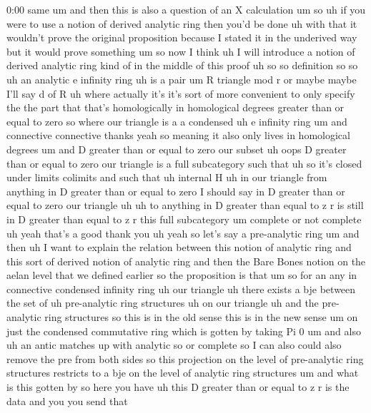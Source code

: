\begin{unfinished}{0:00}
same  um  and  then  this  is  also  a  question
of  an  X
calculation
um  so  uh  if  you  were  to  use  a  notion  of
derived  analytic  ring  then  you'd  be
done  uh  with  that  it  wouldn't  prove  the
original  proposition  because  I  stated  it
in  the  underived  way  but  it  would  prove
something  um  so  now  I  think  uh  I  will
introduce  a  notion  of  derived  analytic
ring  kind  of  in  the  middle  of  this
proof  uh
so  so
definition  so  so  uh  an
analytic  e  infinity  ring
uh  is  a
pair  um  R  triangle  mod  r  or  maybe  maybe
I'll  say  d  of
R  uh
where  actually  it's  it's  sort  of  more
convenient  to  only  specify  the  the  part
that  that's  homologically  in  homological
degrees  greater  than  or  equal  to  zero  so
where  our
triangle  is  a  a
condensed  uh  e  infinity
ring  um
and  connective  connective  thanks
yeah  so  meaning  it  also  only  lives  in
homological  degrees  um  and  D  greater
than  or  equal  to  zero  our  subset  uh  oops
D  greater  than  or  equal  to  zero  our
triangle  is  a  full  subcategory
such  that  uh  so  it's  closed
under  limits
colimits  and  such
that  uh  internal
H  uh  in  our  triangle  from  anything  in  D
greater  than  or  equal  to  zero  I  should
say  in  D  greater  than  or  equal  to  zero
our
triangle  uh
uh  to  anything  in  D  greater  than  equal
to  z  r  is  still  in  D  greater  than  equal
to  z
r  this  full
subcategory
um  complete  or  not  complete  uh  yeah
that's  a  good  thank  you  uh  yeah  so  let's
say  a  pre-analytic
ring
um  and  then
uh  I  want  to  explain  the  relation
between  this  notion  of  analytic  ring  and
this  sort  of  derived  notion  of  analytic
ring  and  then  the  Bare  Bones  notion  on
the  aelan  level  that  we  defined  earlier
so  the  proposition  is
that
um
so  for  an  any  in
connective  condensed  infinity
ring  uh  our
triangle  uh  there  exists  a
bje
between  the  set  of  uh  pre-analytic  ring
structures
uh  on  our
triangle  uh  and  the  pre-analytic  ring
structures  so  this  is  in  the  old
sense  this  is  in  the  new  sense  um  on
just  the  condensed  commutative  ring
which  is  gotten  by  taking  Pi
0  um  and  also  uh  an  antic  matches  up
with  analytic  so  or
complete  so  I  can  also  could  also  remove
the  pre  from  both  sides  so  this
projection  on  the  level  of  pre-analytic
ring  structures  restricts  to  a  bje  on
the  level  of  analytic  ring
structures
um  and  what  is  this  gotten  by  so  here
you  have  uh  this  D  greater  than  or  equal
to  z  r  is  the  data  and  you  you  send  that

\end{unfinished}
